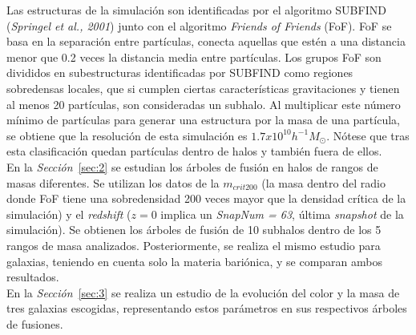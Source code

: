 Las estructuras de la simulación son identificadas por el algoritmo SUBFIND (\textit{Springel et al., 2001}\cite{8}) junto con el algoritmo \textit{Friends of Friends} (FoF). FoF se basa en la separación entre partículas, conecta aquellas que estén a una distancia menor que 0.2 veces la distancia media entre partículas. Los grupos FoF son divididos en subestructuras identificadas por SUBFIND como regiones sobredensas locales, que si cumplen ciertas características gravitaciones y tienen al menos 20 partículas, son consideradas un subhalo. Al multiplicar este número mínimo de partículas para generar una estructura por la masa de una partícula, se obtiene que la resolución de esta simulación es $1.7x10^{10}h^{-1}M_\odot$. Nótese que tras esta clasificación quedan partículas dentro de halos y también fuera de ellos. \\ 

En la \textit{Sección}~\ref{sec:2} se estudian los árboles de fusión en halos de rangos de masas diferentes. Se utilizan los datos de la $m_{crit200}$ (la masa dentro del radio donde FoF tiene una sobredensidad 200 veces mayor que la densidad crítica de la simulación) y el \textit{redshift} ($z=0$ implica un \textit{SnapNum = 63}, última \textit{snapshot} de la simulación). Se obtienen los árboles de fusión de 10 subhalos dentro de los 5 rangos de masa analizados. Posteriormente, se realiza el mismo estudio para galaxias, teniendo en cuenta solo la materia bariónica, y se comparan ambos resultados.\\ 

En la \textit{Sección}~\ref{sec:3} se realiza un estudio de la evolución del color y la masa de tres galaxias escogidas, representando estos parámetros en sus respectivos árboles de fusiones. 

 























